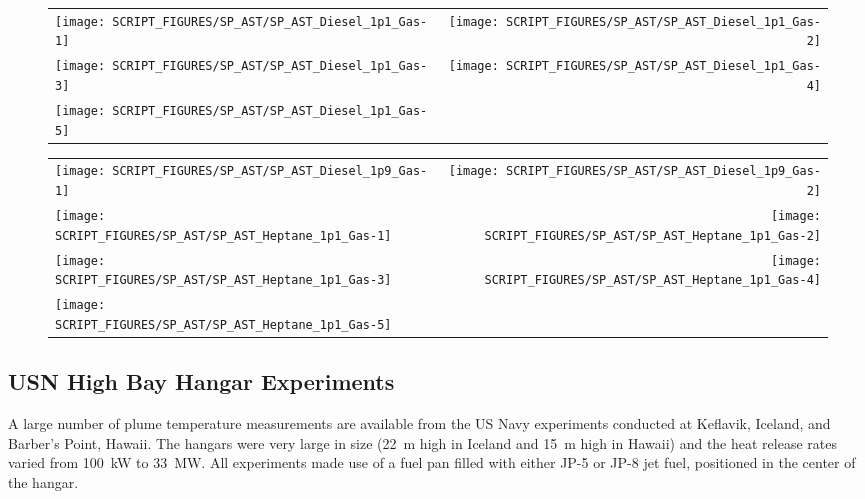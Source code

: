 \begin{figure}[h!]
\begin{tabular*}{\textwidth}{l@{\extracolsep{\fill}}r}
\texttt{[image: SCRIPT\_FIGURES/SP\_AST/SP\_AST\_Diesel\_1p1\_Gas-1]}   &  \texttt{[image: SCRIPT\_FIGURES/SP\_AST/SP\_AST\_Diesel\_1p1\_Gas-2]}    \\
\texttt{[image: SCRIPT\_FIGURES/SP\_AST/SP\_AST\_Diesel\_1p1\_Gas-3]}   &  \texttt{[image: SCRIPT\_FIGURES/SP\_AST/SP\_AST\_Diesel\_1p1\_Gas-4]}     \\
\texttt{[image: SCRIPT\_FIGURES/SP\_AST/SP\_AST\_Diesel\_1p1\_Gas-5]}   &
\end{tabular*}
\label{SP_Diesel_1p1_Gas}
\end{figure}

\newpage

\begin{figure}[p]
\begin{tabular*}{\textwidth}{l@{\extracolsep{\fill}}r}
\texttt{[image: SCRIPT\_FIGURES/SP\_AST/SP\_AST\_Diesel\_1p9\_Gas-1]}   &  \texttt{[image: SCRIPT\_FIGURES/SP\_AST/SP\_AST\_Diesel\_1p9\_Gas-2]}    \\
\texttt{[image: SCRIPT\_FIGURES/SP\_AST/SP\_AST\_Heptane\_1p1\_Gas-1]}  &  \texttt{[image: SCRIPT\_FIGURES/SP\_AST/SP\_AST\_Heptane\_1p1\_Gas-2]}    \\
\texttt{[image: SCRIPT\_FIGURES/SP\_AST/SP\_AST\_Heptane\_1p1\_Gas-3]}  &  \texttt{[image: SCRIPT\_FIGURES/SP\_AST/SP\_AST\_Heptane\_1p1\_Gas-4]}     \\
\texttt{[image: SCRIPT\_FIGURES/SP\_AST/SP\_AST\_Heptane\_1p1\_Gas-5]}  &
\end{tabular*}
\label{SP_Diesel_1p9_Gas}
\end{figure}

\clearpage

\subsection{USN High Bay Hangar Experiments}

\label{USN_Plume}

A large number of plume temperature measurements are available from the US Navy experiments conducted at Keflavik, Iceland, and Barber's Point, Hawaii. The hangars were very large in size (22~m high in Iceland and 15~m high in Hawaii) and the heat release rates varied from 100~kW to 33~MW. All experiments made use of a fuel pan filled with either JP-5 or JP-8 jet fuel, positioned in the center of the hangar.


